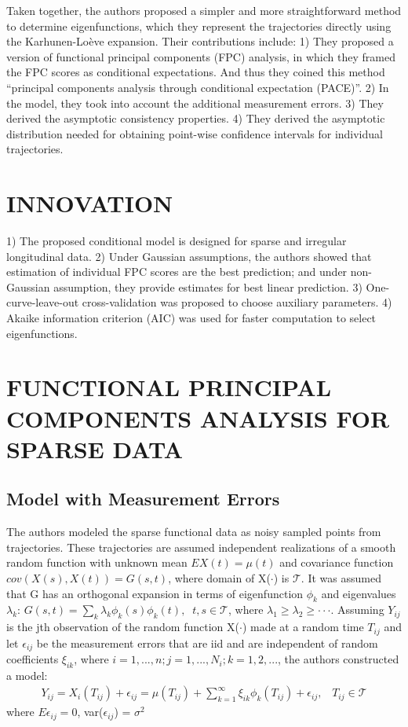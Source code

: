 \documentclass[11pt]{report}
\begin{document}
Taken together, the authors proposed a simpler and more straightforward method to determine eigenfunctions, which they represent the trajectories directly using the Karhunen-Lo\`{e}ve expansion.
Their contributions include: 1) They proposed a version of functional principal components (FPC) analysis, in which they framed the FPC scores as conditional expectations. 
	And thus they coined this method ``principal components analysis through conditional expectation (PACE)''.
	2) In the model, they took into account the additional measurement errors. 
	3) They derived the asymptotic consistency properties.
	4) They derived the asymptotic distribution needed for obtaining point-wise confidence intervals for individual trajectories. 

\section{INNOVATION} 
	1) The proposed conditional model is designed for sparse and irregular longitudinal data. 
	2) Under Gaussian assumptions, the authors showed that estimation of individual FPC scores are the best prediction; and under non-Gaussian assumption, they provide estimates for best linear prediction. 
	3) One-curve-leave-out cross-validation was proposed to choose auxiliary parameters. 
	4) Akaike information criterion (AIC) was used for faster computation to select eigenfunctions. 

\section{FUNCTIONAL PRINCIPAL COMPONENTS ANALYSIS FOR SPARSE DATA}

\subsection*{Model with Measurement Errors}
The authors modeled the sparse functional data as noisy sampled points from trajectories. 
These trajectories are assumed independent realizations of a smooth random function with unknown mean $E{X(t)} = \mu(t)$ and covariance function $cov(X(s), X(t)) = G(s,t)$, where domain of X($\cdot$) is $\mathcal{T}$.
It was assumed that G has an orthogonal expansion in terms of eigenfunction $\phi_k$ and eigenvalues $\lambda_k$: $G(s,t) = \sum_k{\lambda_k\phi_k(s)\phi_k(t)}, \; \; t, s \in \mathcal{T}$, where $\lambda_1 \geq \lambda_2 \geq \cdot \cdot \cdot$.
Assuming $Y_{ij}$ is the jth observation of the random function X($\cdot$) made at a random time $T_{ij}$ and let $\epsilon_{ij}$ be the measurement errors that are iid and are independent of random coefficients $\xi_{ik}$, where $i = 1, ..., n; j = 1, ..., N_i; k = 1, 2, ...$, the authors constructed a model: 
\begin{align}
	\label{eq:eq1}
	Y_{ij} = X_i(T_{ij}) + \epsilon_{ij}  
	= \mu(T_{ij}) + \sum_{k=1}^\infty \xi_{ik}\phi_k(T_{ij}) + \epsilon_{ij}, \; \; \;  T_{ij} \in \mathcal{T} 
\end{align}
where $E{\epsilon_{ij}} = 0$, var($\epsilon_{ij}$) = $\sigma^2$
\end{document}
